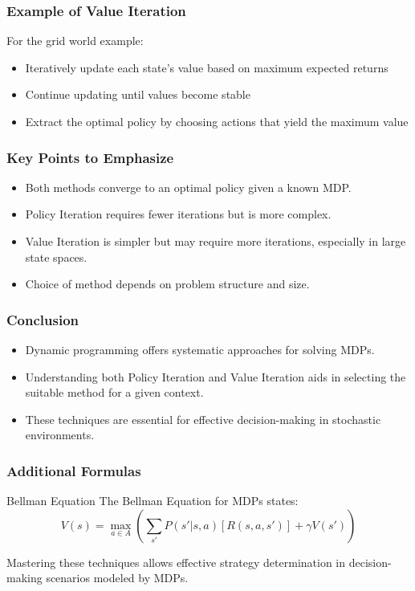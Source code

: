 \documentclass[aspectratio=169]{beamer}
\begin{document}
\begin{frame}[fragile]
    \frametitle{Example of Value Iteration}
    For the grid world example:
    \begin{itemize}
        \item Iteratively update each state's value based on maximum expected returns
        \item Continue updating until values become stable
        \item Extract the optimal policy by choosing actions that yield the maximum value
    \end{itemize}
\end{frame}

\begin{frame}[fragile]
    \frametitle{Key Points to Emphasize}
    \begin{itemize}
        \item Both methods converge to an optimal policy given a known MDP.
        \item Policy Iteration requires fewer iterations but is more complex.
        \item Value Iteration is simpler but may require more iterations, especially in large state spaces.
        \item Choice of method depends on problem structure and size.
    \end{itemize}
\end{frame}

\begin{frame}[fragile]
    \frametitle{Conclusion}
    \begin{itemize}
        \item Dynamic programming offers systematic approaches for solving MDPs.
        \item Understanding both Policy Iteration and Value Iteration aids in selecting the suitable method for a given context.
        \item These techniques are essential for effective decision-making in stochastic environments.
    \end{itemize}
\end{frame}

\begin{frame}[fragile]
    \frametitle{Additional Formulas}
    \begin{block}{Bellman Equation}
    The Bellman Equation for MDPs states:
    \[
    V(s) = \max_{a \in A} \left( \sum_{s'} P(s'|s, a) [R(s, a, s')] + \gamma V(s') \right)
    \]
    \end{block}
    Mastering these techniques allows effective strategy determination in decision-making scenarios modeled by MDPs.
\end{frame}
\end{document}
